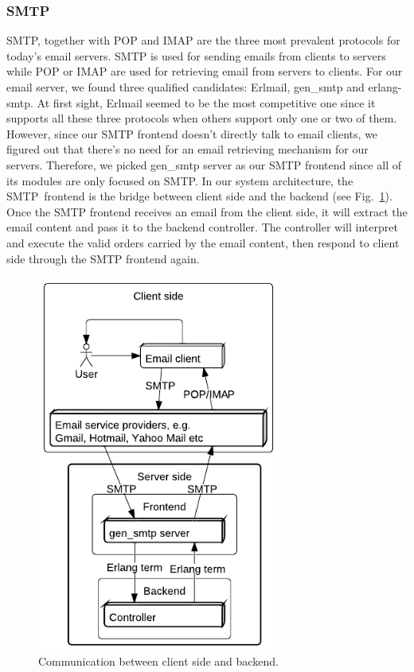 \documentclass[11pt,a4paper]{report}
\begin{document}
\subsubsection{SMTP}
SMTP, together with POP and IMAP are the three most prevalent protocols for
today's email servers.
SMTP is used for sending emails from clients to servers while POP or IMAP
are used for retrieving email from servers to clients.
For our email server, we found three qualified candidates: Erlmail, gen\_smtp
and erlang-smtp.
At first sight, Erlmail seemed to be the most competitive one since it
supports all these three protocols when others support only one or two of them.
However, since our SMTP frontend doesn't directly talk to email clients, we
figured out that there's no need for an email retrieving mechanism for our
servers. Therefore, we picked gen\_smtp server as our SMTP frontend since all
of its modules are only focused on SMTP. In our system architecture, the
SMTP~frontend is the bridge between client side and the backend
(see Fig.~\ref{fig:smtp_arch}).
Once the SMTP frontend receives an email from the client side, it will extract
the email content and pass it to the backend controller. The controller will
interpret and execute the valid orders carried by the email content, then
respond to client side through the SMTP frontend again.

\begin{figure}[h]
 \centering
 \includegraphics[width=8cm]{./graphics/smtp_arch.pdf}
 \caption{Communication between client side and backend.}
 \label{fig:smtp_arch}
\end{figure}
\end{document}
